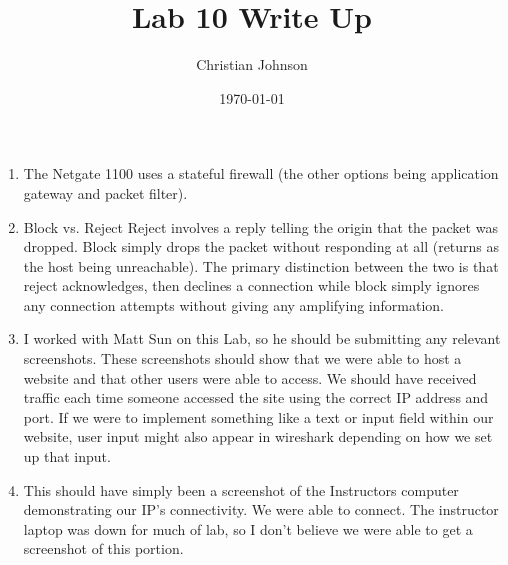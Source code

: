 \documentclass[11pt]{article}
\author{Christian Johnson}
\date{\today}
\title{Lab 10 Write Up}
\begin{document}
\maketitle
\tableofcontents

\begin{enumerate}
\item The Netgate 1100 uses a stateful firewall (the other options being application gateway and packet filter).
\item Block vs. Reject
Reject involves a reply telling the origin that the packet was dropped. Block simply drops the packet without responding at all (returns as the host being unreachable). The primary distinction between the two is that reject acknowledges, then declines a connection while block simply ignores any connection attempts without giving any amplifying information.
\item I worked with Matt Sun on this Lab, so he should be submitting any relevant screenshots.
These screenshots should show that we were able to host a website and that other users were able to access. We should have received traffic each time someone accessed the site using the correct IP address and port. If we were to implement something like a text or input field within our website, user input might also appear in wireshark depending on how we set up that input.
\item This should have simply been a screenshot of the Instructors computer demonstrating our IP's connectivity. We were able to connect. The instructor laptop was down for much of lab, so I don't believe we were able to get a screenshot of this portion.
\end{enumerate}
\end{document}
